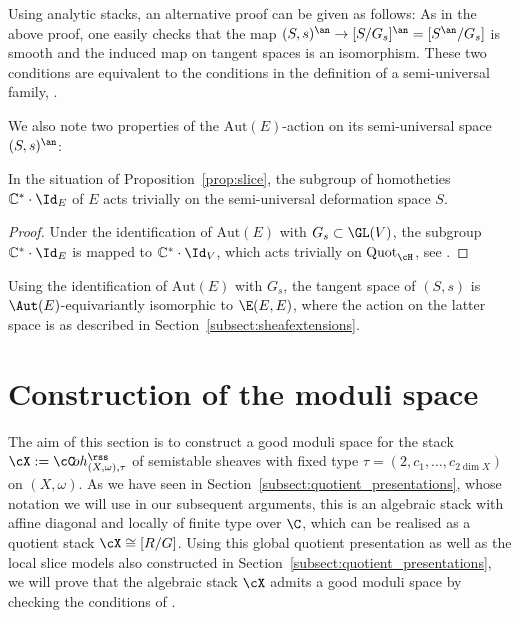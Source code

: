 \begin{rem}
Using analytic stacks, an alternative proof can be given as follows: As in the above proof, one easily checks that the map $(S,s)^{\an} \to [S/G_s]^{\an} = [S^{\an}/G_s]$ is smooth and the induced map on tangent spaces is an isomorphism. These two conditions are equivalent to the conditions in the definition of a semi-universal family, \cf \cite[p.~19]{KosarewStieber90}.
\end{rem}

We also note two properties of the $\mathrm{Aut}(E)$-action on its semi-universal space $(S, s)^{\an}$:

\begin{lemma}\label{lemma:action_of_homotheties}
In the situation of Proposition~\ref{prop:slice}, the subgroup of homotheties $\mathbb{C}^*\cdot \Id_E$ of $E$ acts trivially on the semi-universal deformation space $S$.
\end{lemma}

\begin{proof}
Under the identification of $\mathrm{Aut}(E)$ with $G_s \subset \GL(V)$, the subgroup $\mathbb{C}^*\cdot \Id_E$ is mapped to $\mathbb{C}^*\cdot \Id_V$, which acts trivially on $\mathrm{Quot}_\cH$, see \cite[proof of Lem.~4.3.2]{HL}.
\end{proof}

\begin{lemma}\label{lem:action_on_tangent}
Using the identification of $\mathrm{Aut}(E)$ with $G_s$, the tangent space of $(S, s)$ is $\Aut(E)$-equivariantly isomorphic to $\E (E,E)$, where the action on the latter space is as described in Section~\ref{subsect:sheafextensions}.
\end{lemma}

\section{Construction of the moduli space}\label{sect:construction}

The aim of this section is to construct a good moduli space for the stack $\cX:=\cC\!oh_{(X,\omega),\tau}^{{\rss}}$ of semistable sheaves with fixed type $\tau = (2, c_1, \dots, c_{2 \dim X})$ on $(X,\omega)$. As we have seen in Section~\ref{subsect:quotient_presentations}, whose notation we will use in our subsequent arguments, this is an algebraic stack with affine diagonal and locally of finite type over $\C$, which can be realised as a quotient stack $\cX \cong [R/G]$. Using this global quotient presentation as well as the local slice models also constructed in Section~\ref{subsect:quotient_presentations}, we will prove that the algebraic stack $\cX$ admits a good moduli space by checking the conditions of \cite[Th.\,1.2]{AlperFS}.

